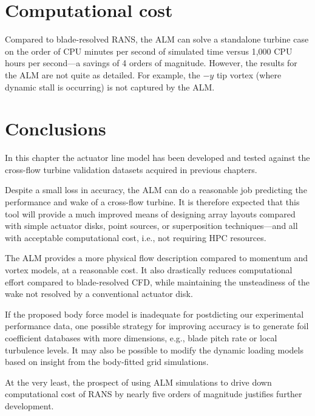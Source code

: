 

\section{Computational cost}


Compared to blade-resolved RANS, the ALM can solve a standalone turbine case on
the order of CPU minutes per second of simulated time versus 1,000 CPU hours per
second---a savings of 4 orders of magnitude. However, the results for the ALM
are not quite as detailed. For example, the $-y$ tip vortex (where dynamic stall
is occurring) is not captured by the ALM.


\section{Conclusions}

In this chapter the actuator line model has been developed and tested against
the cross-flow turbine validation datasets acquired in previous chapters.

Despite a small loss in accuracy, the ALM can do a reasonable job predicting the
performance and wake of a cross-flow turbine. It is therefore expected that this
tool will provide a much improved means of designing array layouts compared with
simple actuator disks, point sources, or superposition techniques---and all with
acceptable computational cost, i.e., not requiring HPC resources.

The ALM provides a more physical flow description compared to momentum and
vortex models, at a reasonable cost. It also drastically reduces computational
effort compared to blade-resolved CFD, while maintaining the unsteadiness of the
wake not resolved by a conventional actuator disk.


If the proposed body force model is inadequate for postdicting our experimental
performance data, one possible strategy for improving accuracy is to generate
foil coefficient databases with more dimensions, e.g., blade pitch rate or local
turbulence levels. It may also be possible to modify the dynamic loading models
based on insight from the body-fitted grid simulations.

At the very least, the prospect of using ALM simulations to drive down
computational cost of RANS by nearly five orders of magnitude justifies further
development.


